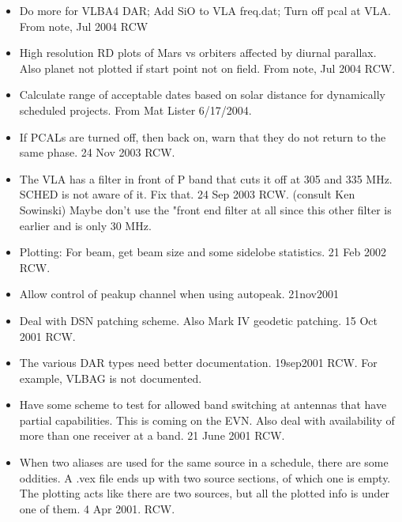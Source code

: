 \documentclass{report}
\begin{document}
\begin{itemize}
\item Do more for VLBA4 DAR;  Add SiO to VLA freq.dat; Turn off pcal
      at VLA.  From note, Jul 2004 RCW

\item High resolution RD plots of Mars vs orbiters affected by
      diurnal parallax.  Also planet not plotted if start point not on
      field.  From note, Jul 2004  RCW.

\item Calculate range of acceptable dates based on solar distance for
      dynamically scheduled projects.  From Mat Lister 6/17/2004.

\item If PCALs are turned off, then back on, warn that they do not
      return to the same phase.  24 Nov 2003 RCW.

\item The VLA has a filter in front of P band that cuts it off at
      305 and 335 MHz.  SCHED is not aware of it.  Fix that.  24 Sep 2003
      RCW.  (consult Ken Sowinski)  Maybe don't use the "front end
      filter at all since this other filter is earlier and is only
      30 MHz.

\item Plotting:  For beam, get beam size and some sidelobe statistics.
      21 Feb 2002 RCW.

\item Allow control of peakup channel when using autopeak.  21nov2001

\item Deal with DSN patching scheme.  Also Mark IV geodetic patching.
      15 Oct 2001  RCW.

\item The various DAR types need better documentation.  19sep2001 RCW.
      For example, VLBAG is not documented.

\item Have some scheme to test for allowed band switching at antennas
      that have partial capabilities.  This is coming on the EVN.
      Also deal with availability of more than one receiver at a band.
      21 June 2001  RCW.

\item When two aliases are used for the same source in a schedule, there
      are some oddities.  A .vex file ends up with two source sections,
      of which one is empty.  The plotting acts like there are two sources,
      but all the plotted info is under one of them.  4 Apr 2001.  RCW.


\end{itemize}
\end{document}
